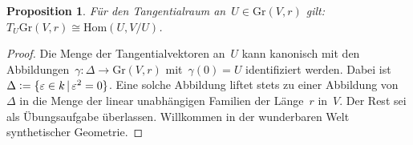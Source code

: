 \documentclass[a4paper,ngerman,12pt]{scrartcl}
\theoremstyle{definition}
\theoremstyle{plain}
\newtheorem{prop}[defn]{Proposition}
\theoremstyle{remark}
\newcommand{\Hom}{\mathrm{Hom}}
\newcommand{\defeq}{\vcentcolon=}
\newcommand{\Gr}{\mathrm{Gr}}
\begin{document}
\begin{prop}Für den Tangentialraum an~$U \in \Gr(V,r)$ gilt:
$T_U \Gr(V,r) \cong \Hom(U, V/U)$.\end{prop}

\begin{proof}Die Menge der Tangentialvektoren an~$U$ kann kanonisch mit den
Abbildungen~$\gamma : \Delta \to \Gr(V,r)$ mit~$\gamma(0) = U$ identifiziert
werden. Dabei ist~$\Delta \defeq \{ \varepsilon \in k \,|\, \varepsilon^2 = 0 \}$.
Eine solche Abbildung liftet stets zu einer Abbildung von~$\Delta$ in die Menge
der linear unabhängigen Familien der Länge~$r$ in~$V$. Der Rest sei als
Übungsaufgabe überlassen. Willkommen in der wunderbaren Welt synthetischer
Geometrie.
\end{proof}
\end{document}
